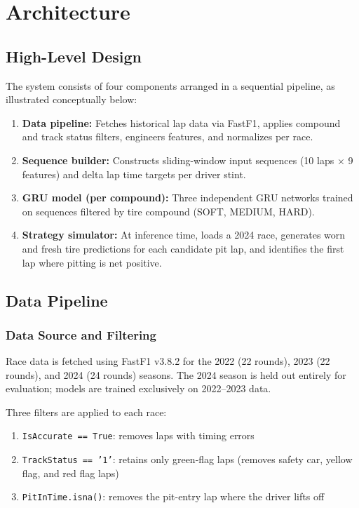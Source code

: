 \documentclass[12pt]{article}
\begin{document}
\section{Architecture}

\subsection{High-Level Design}

The system consists of four components arranged in a sequential pipeline, as illustrated conceptually below:

\begin{enumerate}[noitemsep]
    \item \textbf{Data pipeline:} Fetches historical lap data via FastF1, applies compound and track status filters, engineers features, and normalizes per race.
    \item \textbf{Sequence builder:} Constructs sliding-window input sequences (10 laps $\times$ 9 features) and delta lap time targets per driver stint.
    \item \textbf{GRU model (per compound):} Three independent GRU networks trained on sequences filtered by tire compound (SOFT, MEDIUM, HARD).
    \item \textbf{Strategy simulator:} At inference time, loads a 2024 race, generates worn and fresh tire predictions for each candidate pit lap, and identifies the first lap where pitting is net positive.
\end{enumerate}

\subsection{Data Pipeline}

\subsubsection{Data Source and Filtering}

Race data is fetched using FastF1 v3.8.2 for the 2022 (22 rounds), 2023 (22 rounds), and 2024 (24 rounds) seasons. The 2024 season is held out entirely for evaluation; models are trained exclusively on 2022--2023 data.

Three filters are applied to each race:
\begin{enumerate}[noitemsep]
    \item \texttt{IsAccurate == True}: removes laps with timing errors
    \item \texttt{TrackStatus == '1'}: retains only green-flag laps (removes safety car, yellow flag, and red flag laps)
    \item \texttt{PitInTime.isna()}: removes the pit-entry lap where the driver lifts off
\end{enumerate}
\end{document}
